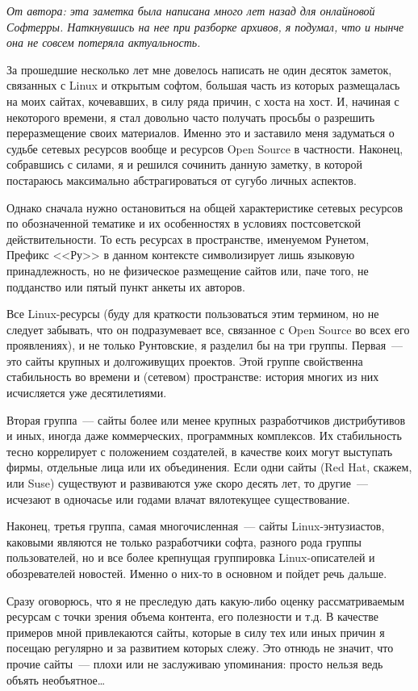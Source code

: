 \textsl{От автора: эта заметка была написана много лет назад для онлайновой Софтерры. Наткнувшись на нее при разборке архивов, я подумал, что и нынче она не совсем потеряла актуальность.}\medskip

За прошедшие несколько лет мне довелось написать не один десяток заметок, связанных с Linux и открытым софтом, большая часть из которых размещалась на моих сайтах, кочевавших, в силу ряда причин, с хоста на хост. И, начиная с некоторого времени, я стал довольно часто получать просьбы о разрешить переразмещение своих материалов. Именно это и заставило меня задуматься о судьбе сетевых ресурсов вообще и ресурсов Open Source в частности. Наконец, собравшись с силами, я и решился сочинить данную заметку, в которой постараюсь максимально абстрагироваться от сугубо личных аспектов. 

Однако сначала нужно остановиться на общей характеристике сетевых ресурсов по обозначенной тематике и их особенностях в условиях постсоветской действительности. То есть ресурсах в пространстве, именуемом Рунетом, Префикс <<Ру>> в данном контексте символизирует лишь языковую принадлежность, но не физическое размещение сайтов или, паче того, не подданство или пятый пункт анкеты их авторов. 

Все Linux-ресурсы (буду для краткости пользоваться этим термином, но не следует забывать, что он подразумевает все, связанное с Open Source во всех его проявлениях), и не только Рунтовские, я разделил бы на три группы. Первая~--- это сайты крупных и долгоживущих проектов. Этой группе свойственна стабильность во времени и (сетевом) пространстве: история многих из них исчисляется уже десятилетиями.

Вторая группа~--- сайты более или менее крупных разработчиков дистрибутивов и иных, иногда даже коммерческих, программных комплексов. Их стабильность тесно коррелирует с положением создателей, в качестве коих могут выступать фирмы, отдельные лица или их объединения. Если одни сайты (Red Hat, скажем, или Suse) существуют и развиваются уже скоро десять лет, то другие~--- исчезают в одночасье или годами влачат вялотекущее существование. 

Наконец, третья группа, самая многочисленная~--- сайты Linux-энтузиастов, каковыми являются не только разработчики софта, разного рода группы пользователей, но и все более крепнущая группировка Linux-описателей и обозревателей новостей. Именно о них-то в основном и пойдет речь дальше. 

Сразу оговорюсь, что я не преследую дать какую-либо оценку рассматриваемым ресурсам с точки зрения объема контента, его полезности и т.д. В качестве примеров мной привлекаются сайты, которые в силу тех или иных причин я посещаю регулярно и за развитием которых слежу. Это отнюдь не значит, что прочие сайты~--- плохи или не заслуживаю упоминания: просто нельзя ведь объять необъятное\dots 

